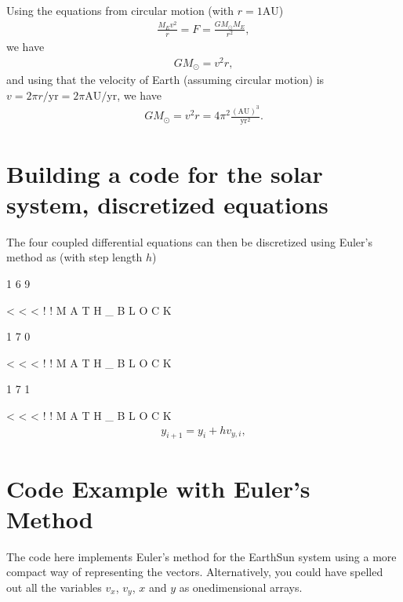 \documentclass[letterpaper,10pt,english]{sphinxmanual}
\begin{document}
Using the equations from circular motion (with \(r =1\mathrm{AU}\))
\begin{equation*}
\begin{split}
\frac{M_E v^2}{r} = F = \frac{GM_{\odot}M_E}{r^2},
\end{split}
\end{equation*}
we have
\begin{equation*}
\begin{split}
GM_{\odot}=v^2r,
\end{split}
\end{equation*}
and using that the velocity of Earth (assuming circular motion) is
\(v = 2\pi r/\mathrm{yr}=2\pi\mathrm{AU}/\mathrm{yr}\), we have
\begin{equation*}
\begin{split}
GM_{\odot}= v^2r = 4\pi^2 \frac{(\mathrm{AU})^3}{\mathrm{yr}^2}.
\end{split}
\end{equation*}

\section{Building a code for the solar system, discretized equations}
\label{\detokenize{chapter1:building-a-code-for-the-solar-system-discretized-equations}}
The four coupled differential equations can then be discretized using Euler’s method as (with step length \(h\))

1
6
9

\textless{}
\textless{}
\textless{}
!
!
M
A
T
H
\_
B
L
O
C
K

1
7
0

\textless{}
\textless{}
\textless{}
!
!
M
A
T
H
\_
B
L
O
C
K

1
7
1

\textless{}
\textless{}
\textless{}
!
!
M
A
T
H
\_
B
L
O
C
K
\begin{equation*}
\begin{split}
y_{i+1}=y_i+hv_{y,i},
\end{split}
\end{equation*}

\section{Code Example with Euler’s Method}
\label{\detokenize{chapter1:code-example-with-euler-s-method}}
The code here implements Euler’s method for the Earth\sphinxhyphen{}Sun system using a more compact way of representing the vectors. Alternatively, you could have spelled out all the variables \(v_x\), \(v_y\), \(x\) and \(y\) as one\sphinxhyphen{}dimensional arrays.
\end{document}
